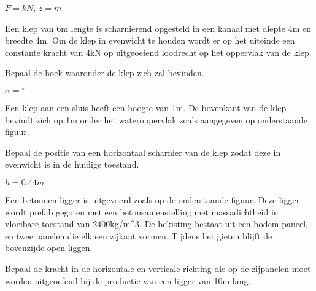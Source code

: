 	\begin{antwoord}
		$F = \unit{}{kN}$, $z=\unit{}{m}$ 
	\end{antwoord}
	\begin{toepassing}
		\label{sluisklephoek}
Een klep van 6m lengte is scharnierend opgesteld in een kanaal met diepte 4m en breedte 4m. Om de klep in evenwicht te houden wordt er op het uiteinde een constante kracht van \unit{4}{kN} op uitgeoefend loodrecht op het oppervlak van de klep.
		
Bepaal de hoek waaronder de klep zich zal bevinden.
		\begin{center}
		\end{center}
	\end{toepassing}
	\begin{antwoord}
		$\alpha = \unit{}{^\circ}$ 
	\end{antwoord}	
	\begin{toepassing}
		\label{sluisklep}
Een klep aan een sluis heeft een hoogte van \unit{1}{m}. De bovenkant van de klep bevindt zich op 1m onder het wateroppervlak zoals aangegeven op onderstaande figuur.
		
Bepaal de positie van een horizontaal scharnier van de klep zodat deze in evenwicht is in de huidige toestand.
		\begin{center}
			
		\end{center}
	\end{toepassing}
	\begin{antwoord}
		$h = \unit{0.44}{m}$
	\end{antwoord}
	\begin{toepassing}
		\label{betonnenligger}
Een betonnen ligger is uitgevoerd zoals op de onderstaande figuur. Deze ligger wordt prefab gegoten met een betonsamenstelling met massadichtheid in vloeibare toestand van \unit{2400}{kg/m^3}. De bekisting bestaat uit een bodem paneel, en twee panelen die elk een zijkant vormen. Tijdens het gieten blijft de bovenzijde open liggen.
		
Bepaal de kracht in de horizontale en verticale richting die op de zijpanelen moet worden uitgeoefend bij de productie van een ligger van \unit{10}{m} lang.
		\begin{center}
			
		\end{center}
	\end{toepassing}
